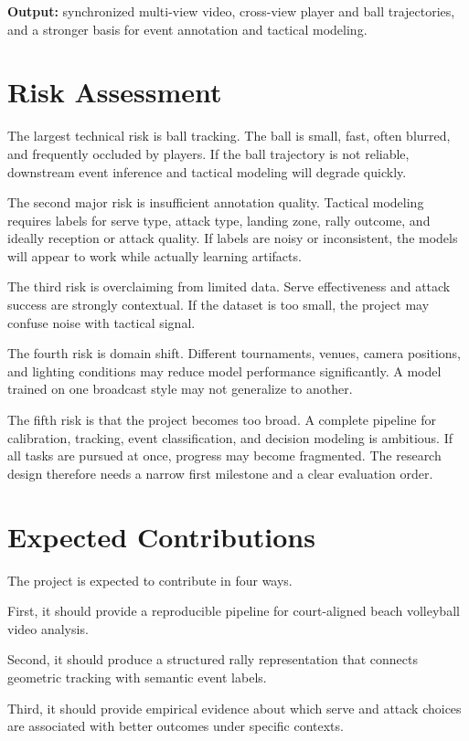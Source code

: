 \documentclass[a4paper]{article}
\begin{document}
\textbf{Output:} synchronized multi-view video, cross-view player and ball trajectories, and a stronger basis for event annotation and tactical modeling.

\section{Risk Assessment}
The largest technical risk is ball tracking. The ball is small, fast, often blurred, and frequently occluded by players. If the ball trajectory is not reliable, downstream event inference and tactical modeling will degrade quickly.

The second major risk is insufficient annotation quality. Tactical modeling requires labels for serve type, attack type, landing zone, rally outcome, and ideally reception or attack quality. If labels are noisy or inconsistent, the models will appear to work while actually learning artifacts.

The third risk is overclaiming from limited data. Serve effectiveness and attack success are strongly contextual. If the dataset is too small, the project may confuse noise with tactical signal.

The fourth risk is domain shift. Different tournaments, venues, camera positions, and lighting conditions may reduce model performance significantly. A model trained on one broadcast style may not generalize to another.

The fifth risk is that the project becomes too broad. A complete pipeline for calibration, tracking, event classification, and decision modeling is ambitious. If all tasks are pursued at once, progress may become fragmented. The research design therefore needs a narrow first milestone and a clear evaluation order.

\section{Expected Contributions}
The project is expected to contribute in four ways.

First, it should provide a reproducible pipeline for court-aligned beach volleyball video analysis.

Second, it should produce a structured rally representation that connects geometric tracking with semantic event labels.

Third, it should provide empirical evidence about which serve and attack choices are associated with better outcomes under specific contexts.
\end{document}

